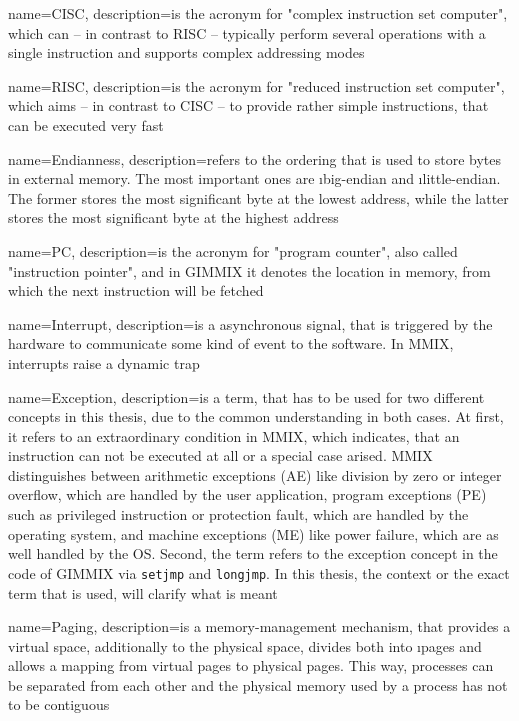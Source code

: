 {
	name={CISC},
	description={is the acronym for "complex instruction set computer", which can -- in contrast to \gls{RISC} -- typically perform several operations with a single instruction and supports complex addressing modes \citep{glcisc}}
}

{
	name={RISC},
	description={is the acronym for "reduced instruction set computer", which aims -- in contrast to \gls{CISC} -- to provide rather simple instructions, that can be executed very fast \citep{glrisc}}
}

{
	name={Endianness},
	description={refers to the ordering that is used to store bytes in external memory. The most important ones are \i{big-endian} and \i{little-endian}. The former stores the most significant byte at the lowest address, while the latter stores the most significant byte at the highest address \citep{glendianness}}
}

{
	name={PC},
	description={is the acronym for "program counter", also called "instruction pointer", and in GIMMIX it denotes the location in memory, from which the next instruction will be fetched}
}

{
	name={Interrupt},
	description={is a asynchronous signal, that is triggered by the hardware to communicate some kind of event to the software. In MMIX, interrupts raise a dynamic trap}
}

{
	name={Exception},
	description={is a term, that has to be used for two different concepts in this thesis, due to the common understanding in both cases. At first, it refers to an extraordinary condition in MMIX, which indicates, that an instruction can not be executed at all or a special case arised. MMIX distinguishes between arithmetic exceptions (AE) like division by zero or integer overflow, which are handled by the user application, program exceptions (PE) such as privileged instruction or protection fault, which are handled by the operating system, and machine exceptions (ME) like power failure, which are as well handled by the OS. Second, the term refers to the exception concept in the code of GIMMIX via {\tt setjmp} and {\tt longjmp}. In this thesis, the context or the exact term that is used, will clarify what is meant}
}

{
	name={Paging},
	description={is a memory-management mechanism, that provides a virtual space, additionally to the physical space, divides both into \i{pages} and allows a mapping from virtual pages to physical pages. This way, processes can be separated from each other and the physical memory used by a process has not to be contiguous}
}

